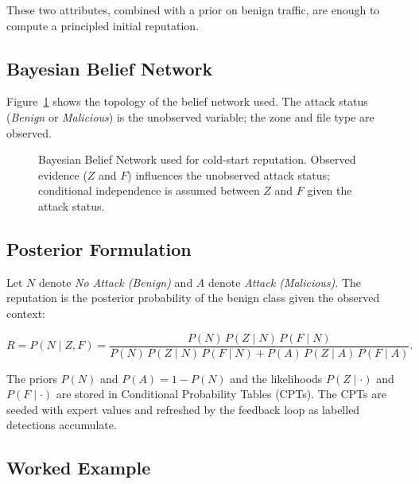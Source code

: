\documentclass[12pt, a4paper]{report}
\begin{document}
These two attributes, combined with a prior on benign traffic, are
enough to compute a principled initial reputation.

\subsection{Bayesian Belief Network}

Figure~\ref{fig:bbn-topology} shows the topology of the belief network
used. The attack status (\emph{Benign} or \emph{Malicious}) is the
unobserved variable; the zone and file type are observed.

\begin{figure}[H]
\centering
{}
\caption{Bayesian Belief Network used for cold-start reputation.
Observed evidence ($Z$ and $F$) influences the unobserved attack status;
conditional independence is assumed between $Z$ and $F$ given the attack
status.}
\label{fig:bbn-topology}
\end{figure}

\subsection{Posterior Formulation}

Let $N$ denote \emph{No Attack (Benign)} and $A$ denote \emph{Attack
(Malicious)}. The reputation is the posterior probability of the benign
class given the observed context:

\[
R = P(N \mid Z, F) = \frac{P(N) \, P(Z \mid N) \, P(F \mid N)}
{P(N) \, P(Z \mid N) \, P(F \mid N) + P(A) \, P(Z \mid A) \, P(F \mid A)}.
\]

The priors $P(N)$ and $P(A) = 1 - P(N)$ and the likelihoods
$P(Z \mid \cdot)$ and $P(F \mid \cdot)$ are stored in Conditional
Probability Tables (CPTs). The CPTs are seeded with expert values and
refreshed by the feedback loop as labelled detections accumulate.

\subsection{Worked Example}
\end{document}
